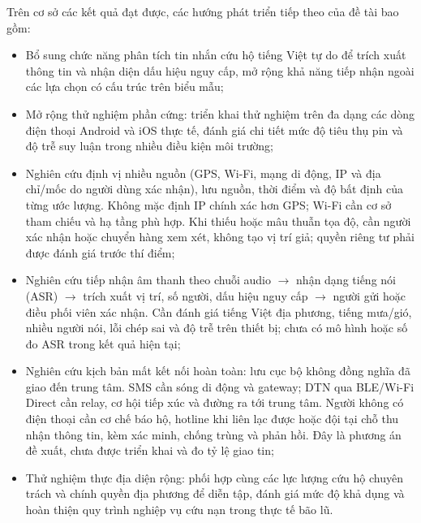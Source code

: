 Trên cơ sở các kết quả đạt được, các hướng phát triển tiếp theo của đề tài bao gồm:
\begin{itemize}
\item Bổ sung chức năng phân tích tin nhắn cứu hộ tiếng Việt tự do để trích xuất thông tin và nhận diện dấu hiệu nguy cấp, mở rộng khả năng tiếp nhận ngoài các lựa chọn có cấu trúc trên biểu mẫu;
\item Mở rộng thử nghiệm phần cứng: triển khai thử nghiệm trên đa dạng các dòng điện thoại Android và iOS thực tế, đánh giá chi tiết mức độ tiêu thụ pin và độ trễ suy luận trong nhiều điều kiện môi trường;
\item Nghiên cứu định vị nhiều nguồn (GPS, Wi-Fi, mạng di động, IP và địa chỉ/mốc do người dùng xác nhận), lưu nguồn, thời điểm và độ bất định của từng ước lượng. Không mặc định IP chính xác hơn GPS; Wi-Fi cần cơ sở tham chiếu và hạ tầng phù hợp. Khi thiếu hoặc mâu thuẫn tọa độ, cần người xác nhận hoặc chuyển hàng xem xét, không tạo vị trí giả; quyền riêng tư phải được đánh giá trước thí điểm;
\item Nghiên cứu tiếp nhận âm thanh theo chuỗi audio $\rightarrow$ nhận dạng tiếng nói (ASR) $\rightarrow$ trích xuất vị trí, số người, dấu hiệu nguy cấp $\rightarrow$ người gửi hoặc điều phối viên xác nhận. Cần đánh giá tiếng Việt địa phương, tiếng mưa/gió, nhiều người nói, lỗi chép sai và độ trễ trên thiết bị; chưa có mô hình hoặc số đo ASR trong kết quả hiện tại;
\item Nghiên cứu kịch bản mất kết nối hoàn toàn: lưu cục bộ không đồng nghĩa đã giao đến trung tâm. SMS cần sóng di động và gateway; DTN qua BLE/Wi-Fi Direct cần relay, cơ hội tiếp xúc và đường ra tới trung tâm. Người không có điện thoại cần cơ chế báo hộ, hotline khi liên lạc được hoặc đội tại chỗ thu nhận thông tin, kèm xác minh, chống trùng và phản hồi. Đây là phương án đề xuất, chưa được triển khai và đo tỷ lệ giao tin;
\item Thử nghiệm thực địa diện rộng: phối hợp cùng các lực lượng cứu hộ chuyên trách và chính quyền địa phương để diễn tập, đánh giá mức độ khả dụng và hoàn thiện quy trình nghiệp vụ cứu nạn trong thực tế bão lũ.
\end{itemize}

